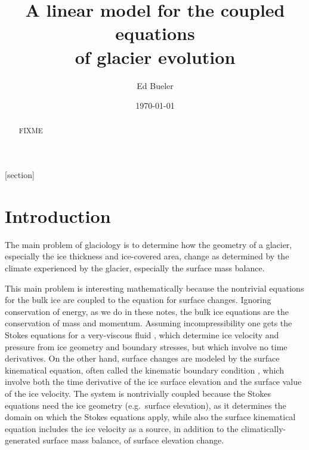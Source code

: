 \documentclass[letterpaper,final,12pt,reqno]{amsart}
\theoremstyle{cstyle}
\theoremstyle{cstyle*}
\theoremstyle{dstyle}
\begin{document}
\title[A linear model for the coupled equations of glacier evolution]{A linear model for the coupled equations \\ of glacier evolution}

\author{Ed Bueler}

\date{\today}

\begin{abstract} FIXME
\end{abstract}

\maketitle


\thispagestyle{empty}

[section]


\section{Introduction} \label{sec:intro}

The main problem of glaciology is to determine how the geometry of a glacier, especially the ice thickness and ice-covered area, change as determined by the climate experienced by the glacier, especially the surface mass balance.

This main problem is interesting mathematically because the nontrivial equations for the bulk ice are coupled to the equation for surface changes.  Ignoring conservation of energy, as we do in these notes, the bulk ice equations are the conservation of mass and momentum.  Assuming incompressibility one gets the Stokes equations for a very-viscous fluid \cite{Elmanetal2014,GreveBlatter2009}, which determine ice velocity and pressure from ice geometry and boundary stresses, but which involve no time derivatives.  On the other hand, surface changes are modeled by the surface kinematical equation, often called the kinematic boundary condition \cite{GreveBlatter2009}, which involve both the time derivative of the ice surface elevation and the surface value of the ice velocity.  The system is nontrivially coupled because the Stokes equations need the ice geometry (e.g.~surface elevation), as it determines the domain on which the Stokes equations apply, while also the surface kinematical equation includes the ice velocity as a source, in addition to the climatically-generated surface mass balance, of surface elevation change.
\end{document}
